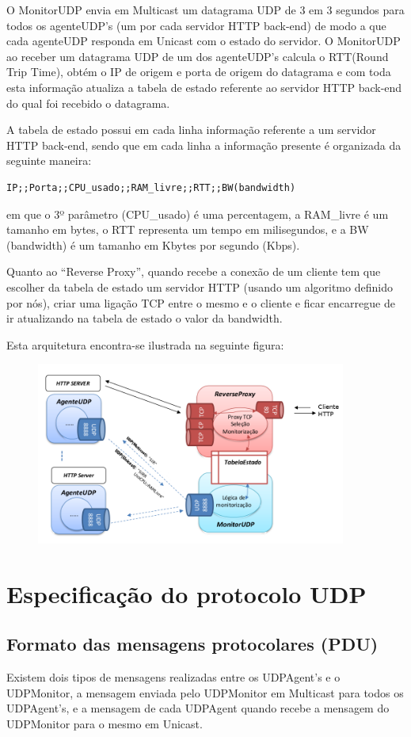 \documentclass{article}
\begin{document}
O MonitorUDP envia em Multicast um datagrama UDP de 3 em 3 segundos para todos os agenteUDP's (um por cada servidor HTTP back-end) de modo a que cada agenteUDP responda em Unicast com o estado do servidor. O MonitorUDP ao receber um datagrama UDP de um dos agenteUDP's calcula o RTT(Round Trip Time), obtém o IP de origem e porta de origem do datagrama e com toda esta informação atualiza a tabela de estado referente ao servidor HTTP back-end do qual foi recebido o datagrama.

A tabela de estado possui em cada linha informação referente a um servidor HTTP back-end, sendo que em cada linha a informação presente é organizada da seguinte maneira:

\begin{verbatim}
IP;;Porta;;CPU_usado;;RAM_livre;;RTT;;BW(bandwidth)
\end{verbatim}
em que o 3º parâmetro (CPU\_usado) é uma percentagem, a RAM\_livre é um tamanho em bytes, o RTT representa um tempo em milisegundos, e a BW (bandwidth) é um tamanho em Kbytes por segundo (Kbps).

Quanto ao ``Reverse Proxy'', quando recebe a conexão de um cliente tem que escolher da tabela de estado um servidor HTTP (usando um algoritmo definido por nós), criar uma ligação TCP entre o mesmo e o cliente e ficar encarregue de ir atualizando na tabela de estado o valor da bandwidth.

Esta arquitetura encontra-se ilustrada na seguinte figura:
\begin{figure}[H]
	\centering
	\includegraphics[height=6cm]{arquitetura.png}
\end{figure}

\section{Especificação do protocolo UDP}

\subsection{Formato das mensagens protocolares (PDU)}
Existem dois tipos de mensagens realizadas entre os UDPAgent's e o UDPMonitor, a mensagem enviada pelo UDPMonitor em Multicast para todos os UDPAgent's, e a mensagem de cada UDPAgent quando recebe a mensagem do UDPMonitor para o mesmo em Unicast.
\end{document}
